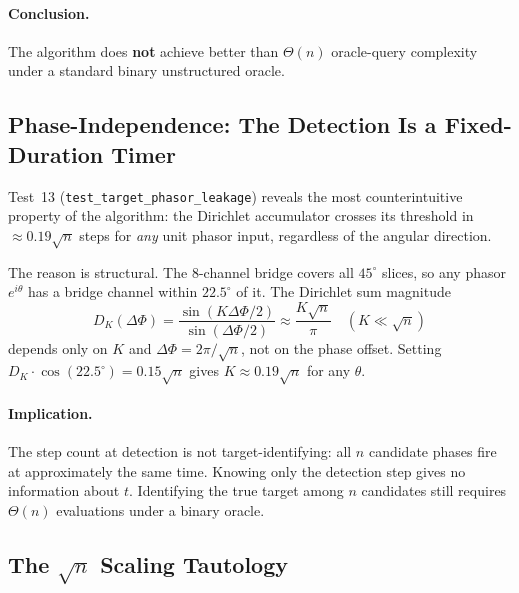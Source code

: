 \documentclass[12pt,a4paper]{article}
\theoremstyle{plain}
\theoremstyle{definition}
\theoremstyle{remark}
\begin{document}
\paragraph{Conclusion.}
The algorithm does \textbf{not} achieve better than $\Theta(n)$ oracle-query
complexity under a standard binary unstructured oracle.

\subsection{Phase-Independence: The Detection Is a Fixed-Duration Timer}
\label{sec:phase-independence}

Test~13 (\texttt{test\_target\_phasor\_leakage}) reveals the most
counterintuitive property of the algorithm: the Dirichlet accumulator
crosses its threshold in $\approx 0.19\sqrt{n}$ steps for \emph{any} unit
phasor input, regardless of the angular direction.

The reason is structural.  The 8-channel bridge covers all $45^\circ$
slices, so any phasor $e^{i\theta}$ has a bridge channel within $22.5^\circ$
of it.  The Dirichlet sum magnitude
\begin{equation}
  D_K(\Delta\Phi) = \frac{\sin(K\Delta\Phi/2)}{\sin(\Delta\Phi/2)}
  \approx \frac{K\sqrt{n}}{\pi} \quad (K \ll \sqrt{n})
\end{equation}
depends only on $K$ and $\Delta\Phi = 2\pi/\sqrt{n}$, not on the phase offset.
Setting $D_K \cdot \cos(22.5^\circ) = 0.15\sqrt{n}$ gives
$K \approx 0.19\sqrt{n}$ for any $\theta$.

\paragraph{Implication.}
The step count at detection is not target-identifying: all $n$ candidate
phases fire at approximately the same time.  Knowing only the detection step
gives no information about $t$.  Identifying the true target among $n$
candidates still requires $\Theta(n)$ evaluations under a binary oracle.

\subsection{The $\sqrt{n}$ Scaling Tautology}
\label{sec:tautology}
\end{document}
